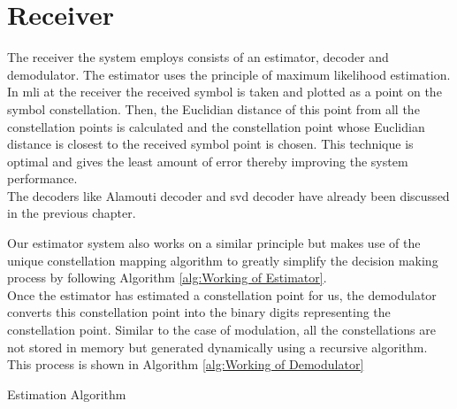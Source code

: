 \section{Receiver}
The receiver the system employs consists of an estimator, decoder and demodulator. The estimator uses the principle of maximum likelihood estimation. In \acrshort{mli} at the receiver the received symbol is taken and plotted as a point on the symbol constellation. Then, the Euclidian distance of this point from all the constellation points is calculated and the constellation point whose Euclidian distance is closest to the received symbol point is chosen. This technique is optimal and gives the least amount of error thereby improving the system performance.\\

The decoders like Alamouti decoder and \acrshort{svd} decoder have already been discussed in the previous chapter.

Our estimator system also works on a similar principle but makes use of the unique constellation mapping algorithm to greatly simplify the decision making process by following Algorithm \ref{alg:Working of Estimator}.\\

Once the estimator has estimated a constellation point for us, the demodulator converts this constellation point into the binary digits representing the constellation point. Similar to the case of modulation, all the constellations are not stored in memory but generated dynamically using a recursive algorithm. This process is shown in Algorithm \ref{alg:Working of Demodulator} 

\begin{algorithm}[!htbp]
\caption{Estimation Algorithm}
\label{alg:Working of Estimator}
\begin{algorithmic}
		\ENDIF
		\ENDIF
	\ENDIF
\ENDWHILE
\end{algorithmic}
\end{algorithm} 

